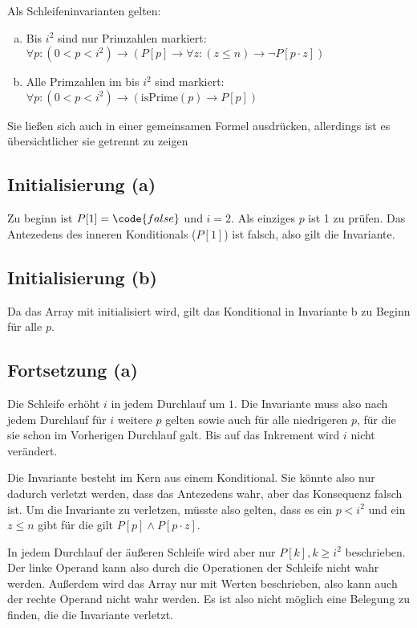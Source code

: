 \documentclass[parskip=half,a4paper]{scrartcl}
\begin{document}
Als Schleifeninvarianten gelten:

\begin{enumerate}[a)]
	\item Bis $i^2$ sind nur Primzahlen markiert: $\forall p: (0 < p < i^2) \rightarrow (P[p] \rightarrow \forall z: (z \le n) \rightarrow
	\neg P[p \cdot z])$

	\item Alle Primzahlen im bis $i^2$ sind markiert: $\forall p: (0 < p < i^2) \rightarrow (\text{isPrime}(p) \rightarrow P[p])$
\end{enumerate}

Sie ließen sich auch in einer gemeinsamen Formel ausdrücken, allerdings ist es übersichtlicher sie getrennt zu zeigen

\subsection*{Initialisierung (a)}

Zu beginn ist $P[1] = \code{false}$ und $i = 2$. Als einziges $p$ ist 1 zu prüfen. Das Antezedens des inneren Konditionals ($P[1]$) ist falsch, also gilt die Invariante.

\subsection*{Initialisierung (b)}

Da das Array mit  initialisiert wird, gilt das Konditional in Invariante b zu Beginn für alle $p$.

\subsection*{Fortsetzung (a)}

Die Schleife erhöht $i$ in jedem Durchlauf um $1$. Die Invariante muss also nach jedem Durchlauf für $i$ weitere $p$ gelten sowie auch für alle niedrigeren $p$, für die sie schon im Vorherigen Durchlauf galt. Bis auf das Inkrement wird $i$ nicht verändert.

Die Invariante besteht im Kern aus einem Konditional. Sie könnte also nur dadurch verletzt werden, dass das Antezedens wahr, aber das Konsequenz falsch ist. Um die Invariante zu verletzen, müsste also gelten, dass es ein $p < i^2$ und ein $z ≤ n$ gibt für die gilt $P[p] ∧ P[p \cdot z]$.

In jedem Durchlauf der äußeren Schleife wird aber nur $P[k], k ≥i^2$ beschrieben. Der linke Operand kann also durch die Operationen der Schleife nicht wahr werden. Außerdem wird das Array nur mit  Werten beschrieben, also kann auch der rechte Operand nicht wahr werden. Es ist also nicht möglich eine Belegung zu finden, die die Invariante verletzt.
\end{document}
